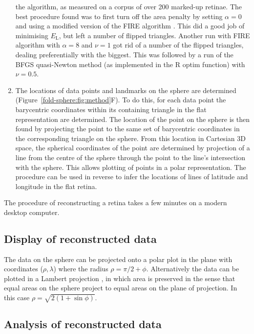 \documentclass[10pt]{article}
\begin{document}
\begin{enumerate}
  the algorithm, as measured on a corpus of over 200 marked-up
  retinae. The best procedure found was to first turn off the area
  penalty by setting $\alpha=0$ and using a modified version of the
  FIRE algorithm \cite{BitzEtal06stru}. This did a good job of
  minimising $E_\mathrm{L}$, but left a number of flipped
  triangles. Another run with FIRE algorithm with $\alpha=8$ and
  $\nu=1$ got rid of a number of the flipped triangles, dealing
  preferentially with the biggest. This was followed by a run of the
  BFGS quasi-Newton method (as implemented in the R optim function)
  with $\nu=0.5$.
\item The locations of data points and landmarks on the sphere are
  determined (Figure~\ref{fold-sphere:fig:method}F). To do this, for
  each data point the barycentric coordinates within its containing
  triangle in the flat representation are determined.  The location of
  the point on the sphere is then found by projecting the point to the
  same set of barycentric coordinates in the corresponding triangle on
  the sphere. From this location in Cartesian 3D space, the spherical
  coordinates of the point are determined by projection of a line from
  the centre of the sphere through the point to the line's
  intersection with the sphere. This allows plotting of points in a
  polar representation. The procedure can be used in reverse to infer
  the locations of lines of latitude and longitude in the flat retina.
\end{enumerate}

The procedure of reconstructing a retina takes a few minutes on a
modern desktop computer.

\subsection*{Display of reconstructed data}
\label{retistruct_plos:sec:displ-reconstr-data}

The data on the sphere can be projected onto a polar plot in the plane
with coordinates ($\rho, \lambda$) where the radius $\rho=\pi/2 +
\phi$. Alternatively the data can be plotted in a Lambert projection
\cite{FishEtal87spat}, in which area is preserved in the sense that
equal areas on the sphere project to equal areas on the plane of
projection. In this case $\rho=\sqrt{2(1+\sin\phi)}$.

\subsection*{Analysis of reconstructed data}
\label{retistruct_plos:sec:analys-reconstr-data}
\end{document}
